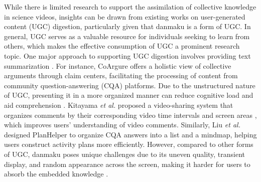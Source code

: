While there is limited research to support the assimilation of collective knowledge in science videos, insights can be drawn from existing works on user-generated content (UGC) digestion, particularly given that danmaku is a form of UGC. 
In general, UGC serves as a valuable resource for individuals seeking to learn from others, which makes the effective consumption of UGC a prominent research topic. 
One major approach to supporting UGC digestion involves providing text summarization \cite{dave2004flash, hoque2015convisit}. For instance, CoArgure offers a holistic view of collective arguments \cite{liu2023coargue} through claim centers, facilitating the processing of content from community question-answering (CQA) platforms. Due to the unstructured nature of UGC, presenting it in a more organized manner can reduce cognitive load and aid comprehension \cite{liu2022planhelper}. Kitayama \textit{et al.} proposed a video-sharing system that organizes comments by their corresponding video time intervals and screen areas \cite{kitayama2008organizing}, which improves users’ understanding of video comments. Similarly, Liu \textit{et al.} designed PlanHelper to organize CQA answers \cite{liu2022planhelper} into a list and a mindmap, helping users construct activity plans more efficiently.
However, compared to other forms of UGC, danmaku poses unique challenges due to its uneven quality, transient display, and random appearance across the screen, making it harder for users to absorb the embedded knowledge \cite{ma2017video, yao2017understanding}.




